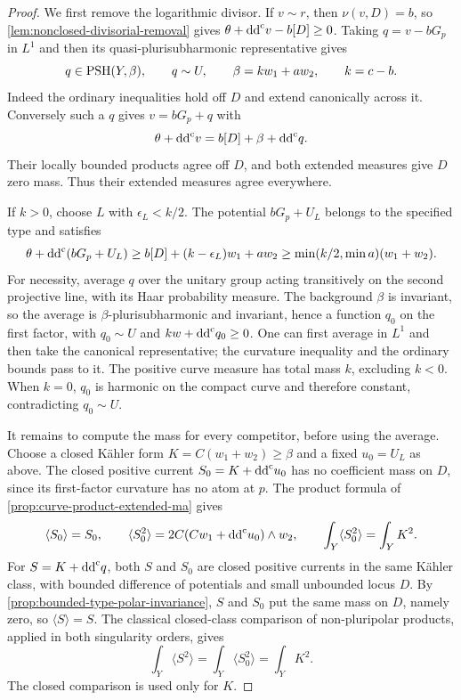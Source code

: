 \begin{proof}
We first remove the logarithmic divisor. If $v\sim r$, then $\nu(v,D)=b$, so \cref{lem:nonclosed-divisorial-removal} gives $\theta+\mathrm{dd}^{\mathrm{c}} v-b[D]\geq0$. Taking $q=v-bG_p$ in $L^1$ and then its quasi-plurisubharmonic representative gives
\[
 q\in\mathrm{PSH}(Y,\beta),\qquad q\sim U,\qquad
 \beta=kw_1+aw_2,\qquad k=c-b.
\]
Indeed the ordinary inequalities hold off $D$ and extend canonically across it. Conversely such a $q$ gives $v=bG_p+q$ with
\[
 \theta+\mathrm{dd}^{\mathrm{c}} v=b[D]+\beta+\mathrm{dd}^{\mathrm{c}} q.
\]
Their locally bounded products agree off $D$, and both extended measures give $D$ zero mass. Thus their extended measures agree everywhere.

If $k>0$, choose $L$ with $\epsilon_L<k/2$. The potential $bG_p+U_L$ belongs to the specified type and satisfies
\[
 \theta+\mathrm{dd}^{\mathrm{c}}(bG_p+U_L)
 \geq b[D]+(k-\epsilon_L)w_1+aw_2
 \geq\min(k/2,\min a)(w_1+w_2).
\]
For necessity, average $q$ over the unitary group acting transitively on the second projective line, with its Haar probability measure. The background $\beta$ is invariant, so the average is $\beta$-plurisubharmonic and invariant, hence a function $q_0$ on the first factor, with $q_0\sim U$ and $kw+\mathrm{dd}^{\mathrm{c}} q_0\geq0$. One can first average in $L^1$ and then take the canonical representative; the curvature inequality and the ordinary bounds pass to it. The positive curve measure has total mass $k$, excluding $k<0$. When $k=0$, $q_0$ is harmonic on the compact curve and therefore constant, contradicting $q_0\sim U$.

It remains to compute the mass for every competitor, before using the average. Choose a closed K\"ahler form $K=C(w_1+w_2)\geq\beta$ and a fixed $u_0=U_L$ as above. The closed positive current $S_0=K+\mathrm{dd}^{\mathrm{c}} u_0$ has no coefficient mass on $D$, since its first-factor curvature has no atom at $p$. The product formula of \cref{prop:curve-product-extended-ma} gives
\[
 \langle S_0\rangle=S_0,\qquad
 \langle S_0^2\rangle=2C(Cw_1+\mathrm{dd}^{\mathrm{c}} u_0)\wedge w_2,
 \qquad \int_Y\langle S_0^2\rangle=\int_YK^2.
\]
For $S=K+\mathrm{dd}^{\mathrm{c}} q$, both $S$ and $S_0$ are closed positive currents in the same K\"ahler class, with bounded difference of potentials and small unbounded locus $D$. By \cref{prop:bounded-type-polar-invariance}, $S$ and $S_0$ put the same mass on $D$, namely zero, so $\langle S\rangle=S$. The classical closed-class comparison of non-pluripolar products, applied in both singularity orders, gives
\[
 \int_Y\langle S^2\rangle=\int_Y\langle S_0^2\rangle=\int_YK^2.
\]
The closed comparison is used only for $K$.


\end{proof}
